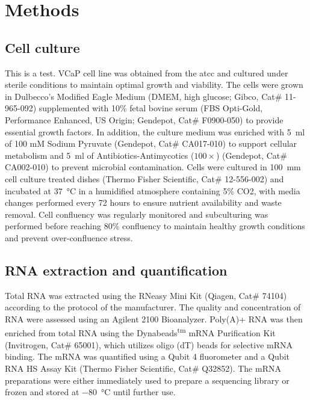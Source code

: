 \documentclass[pdflatex,sn-nature, lineno]{sn-jnl}%
\begin{document}
\section{Methods}\label{sec:methods}

\subsection{Cell culture}

This is a test. VCaP cell line was obtained from the \gls{atcc} and cultured under sterile conditions to maintain optimal growth and viability.
The cells were grown in Dulbecco's Modified Eagle Medium (DMEM, high glucose; Gibco, Cat\# 11-965-092) supplemented with 10\% fetal bovine serum (FBS Opti-Gold, Performance Enhanced, US Origin; Gendepot, Cat\# F0900-050) to provide essential growth factors.
In addition, the culture medium was enriched with \SI{5}{\ml} of 100 mM Sodium Pyruvate (Gendepot, Cat\# CA017-010) to support cellular metabolism and \SI{5}{\ml} of Antibiotics-Antimycotics (\( 100\times \)) (Gendepot, Cat\# CA002-010) to prevent microbial contamination.
Cells were cultured in \SI{100}{\mm} cell culture treated dishes (Thermo Fisher Scientific, Cat\# 12-556-002) and incubated at \SI{37}{\degreeCelsius} in a humidified atmosphere containing 5\% CO2, with media changes performed every 72 hours to ensure nutrient availability and waste removal.
Cell confluency was regularly monitored and subculturing was performed before reaching 80\% confluency to maintain healthy growth conditions and prevent over-confluence stress.

\subsection{RNA extraction and quantification}

Total RNA was extracted using the RNeasy Mini Kit (Qiagen, Cat\# 74104) according to the protocol of the manufacturer.
The quality and concentration of RNA were assessed using an Agilent 2100 Bioanalyzer.
Poly(A)+ RNA was then enriched from total RNA using the Dynabeads\textsuperscript{tm} mRNA Purification Kit (Invitrogen, Cat\# 65001), which utilizes oligo (dT) beads for selective mRNA binding.
The mRNA was quantified using a Qubit 4 fluorometer and a Qubit RNA HS Assay Kit (Thermo Fisher Scientific, Cat\# Q32852).
The mRNA preparations were either immediately used to prepare a sequencing library or frozen and stored at \SI{-80}{\degreeCelsius} until further use.
\end{document}
